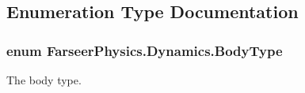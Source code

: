 \subsection{Enumeration Type Documentation}
\hypertarget{namespace_farseer_physics_1_1_dynamics_ab48af7c74608f717f279410b48d77199}{
\subsubsection[{Body\+Type}]{\setlength{\rightskip}{0pt plus 5cm}enum {\bf Farseer\+Physics.\+Dynamics.\+Body\+Type}}}\label{namespace_farseer_physics_1_1_dynamics_ab48af7c74608f717f279410b48d77199}


The body type. 


